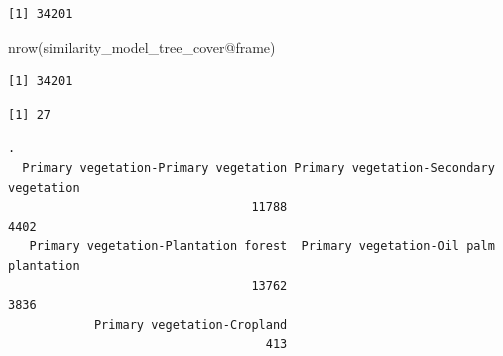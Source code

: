 \documentclass[
  letterpaper,
  DIV=11,
  numbers=noendperiod]{scrartcl}
\newenvironment{Shaded}{\begin{snugshade}}{\end{snugshade}}
\newcommand{\DocumentationTok}[1]{\textcolor[rgb]{0.37,0.37,0.37}{\textit{#1}}}
\newcommand{\FunctionTok}[1]{\textcolor[rgb]{0.28,0.35,0.67}{#1}}
\newcommand{\NormalTok}[1]{\textcolor[rgb]{0.00,0.23,0.31}{#1}}
\newcommand{\OtherTok}[1]{\textcolor[rgb]{0.00,0.23,0.31}{#1}}
\newcommand{\SpecialCharTok}[1]{\textcolor[rgb]{0.37,0.37,0.37}{#1}}
\begin{document}
\begin{Shaded}
\end{Shaded}

\begin{verbatim}
[1] 34201
\end{verbatim}

\begin{Shaded}
\begin{Highlighting}[]
\FunctionTok{nrow}\NormalTok{(similarity\_model\_tree\_cover}\SpecialCharTok{@}\NormalTok{frame)}
\end{Highlighting}
\end{Shaded}

\begin{verbatim}
[1] 34201
\end{verbatim}

\begin{Shaded}
\end{Shaded}

\begin{verbatim}
[1] 27
\end{verbatim}

\begin{Shaded}
\end{Shaded}

\begin{verbatim}
.
  Primary vegetation-Primary vegetation Primary vegetation-Secondary vegetation 
                                  11788                                    4402 
   Primary vegetation-Plantation forest  Primary vegetation-Oil palm plantation 
                                  13762                                    3836 
            Primary vegetation-Cropland 
                                    413 
\end{verbatim}
\end{document}
